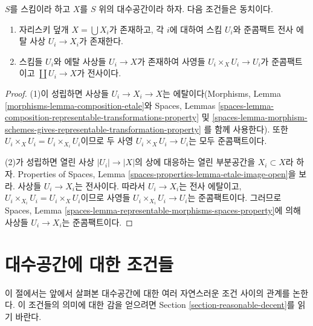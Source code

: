 \begin{lemma}
\label{lemma-characterize-very-reasonable}
$S$를 스킴이라 하고 $X$를 $S$ 위의 대수공간이라 하자.
다음 조건들은 동치이다.
\begin{enumerate}
\item 자리스키 덮개 $X = \bigcup X_i$가 존재하고, 각 $i$에 대하여
스킴 $U_i$와 준콤팩트 전사 에탈 사상 $U_i \to X_i$가 존재한다.
\item 스킴들 $U_i$와 에탈 사상들 $U_i \to X$가 존재하여 사영들
$U_i \times_X U_i \to U_i$가 준콤팩트이고
$\coprod U_i \to X$가 전사이다.
\end{enumerate}
\end{lemma}

\begin{proof}
(1)이 성립하면 사상들 $U_i \to X_i \to X$는 에탈이다(Morphisms,
Lemma \ref{morphisms-lemma-composition-etale}와 Spaces, Lemmas
\ref{spaces-lemma-composition-representable-transformations-property} 및
\ref{spaces-lemma-morphism-schemes-gives-representable-transformation-property}
를 함께 사용한다).
또한 $U_i \times_X U_i = U_i \times_{X_i} U_i$이므로 두 사영
$U_i \times_X U_i \to U_i$는 모두 준콤팩트이다.

\medskip\noindent
(2)가 성립하면 열린 사상 $|U_i| \to |X|$의 상에 대응하는 열린 부분공간을
$X_i \subset X$라 하자. Properties of Spaces, Lemma
\ref{spaces-properties-lemma-etale-image-open}을 보라.
사상들 $U_i \to X_i$는 전사이다. 따라서 $U_i \to X_i$는 전사
에탈이고, $U_i \times_{X_i} U_i = U_i \times_X U_i$이므로 사영들
$U_i \times_{X_i} U_i \to U_i$는 준콤팩트이다.
그러므로 Spaces, Lemma
\ref{spaces-lemma-representable-morphisms-spaces-property}에 의해
사상들 $U_i \to X_i$는 준콤팩트이다.
\end{proof}

\section{대수공간에 대한 조건들}
\label{section-conditions}

\noindent
이 절에서는 앞에서 살펴본 대수공간에 대한 여러 자연스러운 조건 사이의
관계를 논한다. 이 조건들의 의미에 대한 감을 얻으려면 Section
\ref{section-reasonable-decent}를 읽기 바란다.


